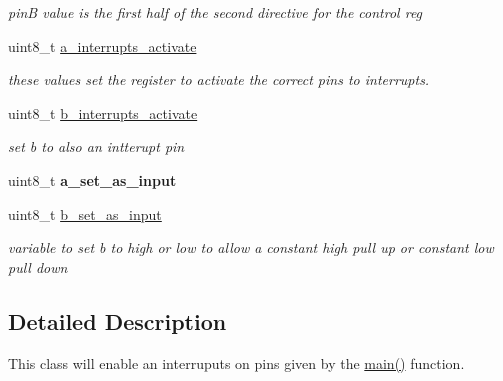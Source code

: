 \begin{DoxyCompactItemize}
\begin{DoxyCompactList}\small\item\em pin\-B value is the first half of the second directive for the control reg \end{DoxyCompactList}\item 
\hypertarget{classencoder__driver_a18d2e4172cb6c4814321a9208b1a1436}{uint8\-\_\-t \hyperlink{classencoder__driver_a18d2e4172cb6c4814321a9208b1a1436}{a\-\_\-interrupts\-\_\-activate}}\label{classencoder__driver_a18d2e4172cb6c4814321a9208b1a1436}

\begin{DoxyCompactList}\small\item\em these values set the register to activate the correct pins to interrupts. \end{DoxyCompactList}\item 
\hypertarget{classencoder__driver_a9429192cb939f1de21becb7153addf22}{uint8\-\_\-t \hyperlink{classencoder__driver_a9429192cb939f1de21becb7153addf22}{b\-\_\-interrupts\-\_\-activate}}\label{classencoder__driver_a9429192cb939f1de21becb7153addf22}

\begin{DoxyCompactList}\small\item\em set b to also an intterupt pin \end{DoxyCompactList}\item 
\hypertarget{classencoder__driver_a4d82ba8ef7726a31b3a3ed6c5ad56351}{uint8\-\_\-t {\bfseries a\-\_\-set\-\_\-as\-\_\-input}}\label{classencoder__driver_a4d82ba8ef7726a31b3a3ed6c5ad56351}

\item 
\hypertarget{classencoder__driver_ac66556b16a250907562deb031a84b379}{uint8\-\_\-t \hyperlink{classencoder__driver_ac66556b16a250907562deb031a84b379}{b\-\_\-set\-\_\-as\-\_\-input}}\label{classencoder__driver_ac66556b16a250907562deb031a84b379}

\begin{DoxyCompactList}\small\item\em variable to set b to high or low to allow a constant high pull up or constant low pull down \end{DoxyCompactList}\end{DoxyCompactItemize}


\subsection{Detailed Description}
This class will enable an interruputs on pins given by the \hyperlink{main_8cpp_a840291bc02cba5474a4cb46a9b9566fe}{main()} function. 

